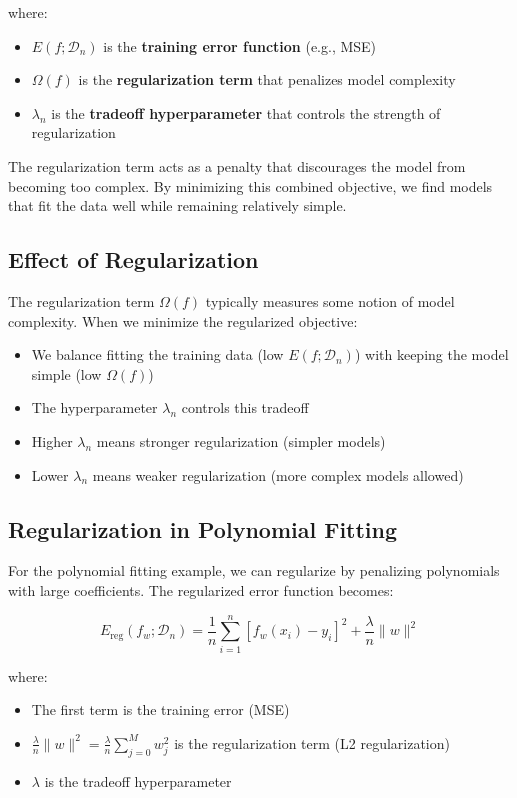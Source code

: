 \documentclass[11pt,a4paper]{article}
\theoremstyle{definition}
\theoremstyle{plain}
\theoremstyle{remark}
\begin{document}
where:
\begin{itemize}
    \item $E(f; \mathcal{D}_n)$ is the \textbf{training error function} (e.g., MSE)
    \item $\Omega(f)$ is the \textbf{regularization term} that penalizes model complexity
    \item $\lambda_n$ is the \textbf{tradeoff hyperparameter} that controls the strength of regularization
\end{itemize}

The regularization term acts as a penalty that discourages the model from becoming too complex. By minimizing this combined objective, we find models that fit the data well while remaining relatively simple.

\subsection{Effect of Regularization}

The regularization term $\Omega(f)$ typically measures some notion of model complexity. When we minimize the regularized objective:
\begin{itemize}
    \item We balance fitting the training data (low $E(f; \mathcal{D}_n)$) with keeping the model simple (low $\Omega(f)$)
    \item The hyperparameter $\lambda_n$ controls this tradeoff
    \item Higher $\lambda_n$ means stronger regularization (simpler models)
    \item Lower $\lambda_n$ means weaker regularization (more complex models allowed)
\end{itemize}

\subsection{Regularization in Polynomial Fitting}

For the polynomial fitting example, we can regularize by penalizing polynomials with large coefficients. The regularized error function becomes:

\[
E_{\text{reg}}(f_w; \mathcal{D}_n) = \frac{1}{n} \sum_{i=1}^{n} [f_w(x_i) - y_i]^2 + \frac{\lambda}{n} \|w\|^2
\]

where:
\begin{itemize}
    \item The first term is the training error (MSE)
    \item $\frac{\lambda}{n} \|w\|^2 = \frac{\lambda}{n} \sum_{j=0}^{M} w_j^2$ is the regularization term (L2 regularization)
    \item $\lambda$ is the tradeoff hyperparameter
\end{itemize}
\end{document}
